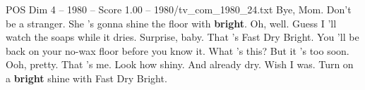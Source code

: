 \begin{textsample}{POS Dim 4 – 1980 – Score 1.00 – 1980/tv\_com\_1980\_24.txt}  \label{ex:f4_pos_065}
Bye, Mom.
Don't be a stranger.
She 's gonna shine the floor with \textbf{bright}.
Oh, well.
Guess I 'll watch the soaps while it dries.
Surprise, baby.
That 's Fast Dry Bright.
You 'll be back on your no-wax floor before you know it.
What 's this?
But it 's too soon.
Ooh, pretty.
That 's me.
Look how shiny.
And already dry.
Wish I was.
Turn on a \textbf{bright} shine with Fast Dry Bright.

\end{textsample}
